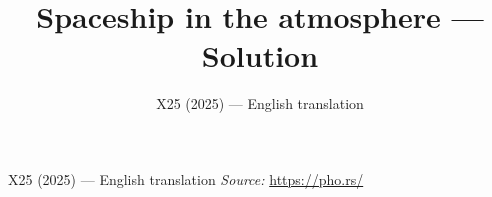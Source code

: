 \documentclass[11pt,a4paper]{article}
\title{\textbf{Spaceship in the atmosphere --- Solution}}
\author{\normalsize X25 (2025) — English translation}
\date{}
\begin{document}
\maketitle
X25 (2025) — English translation
\vspace{1em}
\noindent\textit{Source:} \url{https://pho.rs/}
\end{document}
